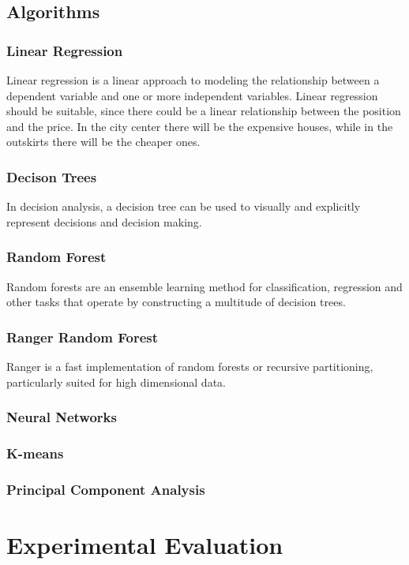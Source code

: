 \documentclass{FR16}
\begin{document}
\subsection{Algorithms}
\subsubsection{Linear Regression}
 Linear regression  is a linear approach to modeling the relationship between a dependent variable and one or more independent variables. Linear regression should be suitable, since there could be a linear relationship between the position and the price. In the city center there will be the expensive houses, while in the outskirts there will be the cheaper ones.
  \subsubsection{Decison Trees}
In decision analysis, a decision tree can be used to visually and explicitly represent decisions and decision making.

 \subsubsection{Random Forest}
 Random forests are an ensemble learning method for classification, regression and other tasks that operate by constructing a multitude of decision trees.
 \subsubsection{Ranger Random Forest}
Ranger is a fast implementation of random forests or recursive partitioning, particularly suited for high dimensional data. 

\subsubsection{Neural Networks}

\subsubsection{K-means}

\subsubsection{Principal Component Analysis}

\newpage
\section{Experimental Evaluation}
\end{document}
